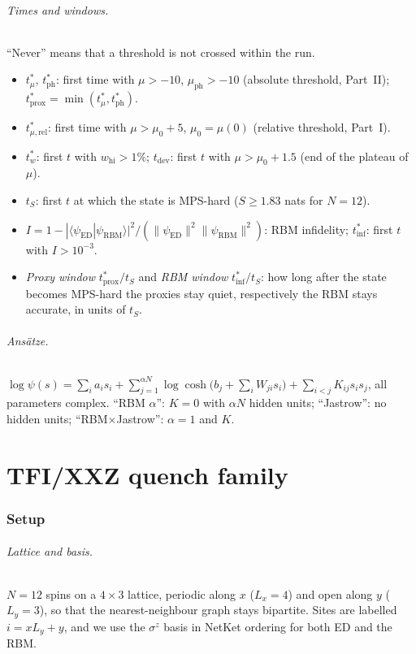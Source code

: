 \documentclass[11pt,a4paper]{article}
\newcommand{\inff}{I}
\newcommand{\tmu}{t^*_\mu}
\newcommand{\tmur}{t^*_{\mu,\mathrm{rel}}}
\newcommand{\tinf}{t^*_{\mathrm{inf}}}
\newcommand{\tph}{t^*_{\mathrm{ph}}}
\newcommand{\tprox}{t^*_{\mathrm{prox}}}
\begin{document}
\paragraph{Times and windows.} ``Never'' means that a threshold is not crossed within the run.
\begin{itemize}
  \item $\tmu$, $\tph$: first time with $\mu>-10$, $\mu_{\mathrm{ph}}>-10$ (absolute threshold, Part~II);
    $\tprox=\min(\tmu,\tph)$.
  \item $\tmur$: first time with $\mu>\mu_0+5$, $\mu_0=\mu(0)$ (relative threshold, Part~I).
  \item $t^*_w$: first $t$ with $w_{\mathrm{hi}}>1\%$; $t_{\mathrm{dev}}$: first $t$ with $\mu>\mu_0+1.5$ (end of the
    plateau of $\mu$).
  \item $t_S$: first $t$ at which the state is MPS-hard ($S\ge1.83$ nats for $N=12$).
  \item $\inff=1-|\langle\psi_{\mathrm{ED}}|\psi_{\mathrm{RBM}}\rangle|^2/(\|\psi_{\mathrm{ED}}\|^2\|\psi_{\mathrm{RBM}}\|^2)$:
    RBM infidelity; $\tinf$: first $t$ with $\inff>10^{-3}$.
  \item \emph{Proxy window} $\tprox/t_S$ and \emph{RBM window} $\tinf/t_S$: how long after the state becomes
    MPS-hard the proxies stay quiet, respectively the RBM stays accurate, in units of $t_S$.
\end{itemize}

\paragraph{Ansätze.}
$\log\psi(s)=\sum_ia_is_i+\sum_{j=1}^{\alpha N}\log\cosh\big(b_j+\sum_iW_{ji}s_i\big)+\sum_{i<j}K_{ij}s_is_j$,
all parameters complex. ``RBM $\alpha$'': $K=0$ with $\alpha N$ hidden units; ``Jastrow'': no hidden units;
``RBM$\times$Jastrow'': $\alpha=1$ and $K$.

\part{TFI/XXZ quench family}

\section{Setup}
\label{sec:setup}

\paragraph{Lattice and basis.}
$N=12$ spins on a $4\times3$ lattice, periodic along $x$ ($L_x=4$) and open along $y$ ($L_y=3$),
so that the nearest-neighbour graph stays bipartite. Sites are labelled $i=xL_y+y$, and we use the
$\sigma^z$ basis in NetKet ordering for both ED and the RBM.
\end{document}
